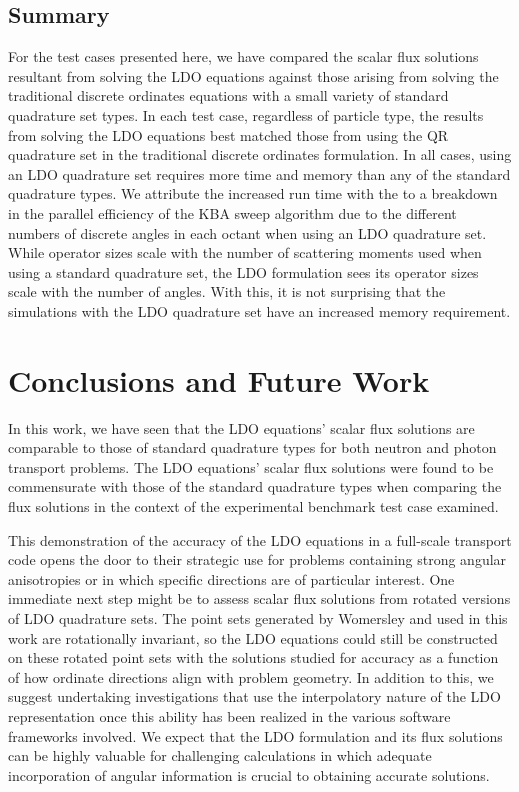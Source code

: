 \documentclass{article} %
\begin{document}
\FloatBarrier
\subsection{Summary}

For the test cases presented here, we have compared the scalar flux solutions
resultant from solving the LDO equations against those arising from solving
the traditional discrete ordinates equations with a small variety of standard
quadrature set types. In each test case, regardless of particle type, the
results from solving the LDO equations best matched those from using the QR
quadrature set in the traditional discrete ordinates formulation. In all
cases, using an LDO quadrature set requires more time and memory than any of
the standard quadrature types. We attribute the increased run time with the to
a breakdown in the parallel efficiency of the KBA sweep algorithm due to the
different numbers of discrete angles in each octant when using an LDO
quadrature set. While operator sizes scale with the number of scattering
moments used when using a standard quadrature set, the LDO formulation sees
its operator sizes scale with the number of angles. With this, it is not
surprising that the simulations with the LDO quadrature set have an increased
memory requirement.

\section{Conclusions and Future Work}
\label{sec:conclusions}

In this work, we have seen that the LDO equations' scalar flux solutions are
comparable to those of standard quadrature types for both neutron and photon
transport problems. The LDO equations' scalar flux solutions were found to be
commensurate with those of the standard quadrature types when comparing the
flux solutions in the context of the experimental benchmark test case
examined.

This demonstration of the accuracy of the LDO equations in a full-scale
transport code opens the door to their strategic use for problems containing
strong angular anisotropies or in which specific directions are of particular
interest. One immediate next step might be to assess scalar flux solutions
from rotated versions of LDO quadrature sets. The point sets generated by
Womersley and used in this work are rotationally invariant, so the LDO
equations could still be constructed on these rotated point sets with the
solutions studied for accuracy as a function of how ordinate directions align
with problem geometry. In addition to this, we suggest undertaking
investigations that use the interpolatory nature of the LDO representation
once this ability has been realized in the various software frameworks
involved. We expect that the LDO formulation and its flux solutions can be
highly valuable for challenging calculations in which adequate incorporation
of angular information is crucial to obtaining accurate solutions.
\end{document}

